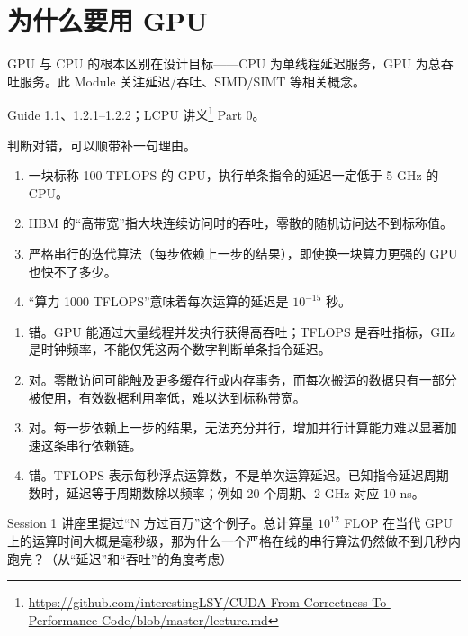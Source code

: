 \documentclass[11pt,a4paper,fontset=none]{ctexart}
\begin{document}
\section{为什么要用 GPU}

GPU 与 CPU 的根本区别在设计目标——CPU 为单线程延迟服务，GPU 为总吞吐服务。此 Module 关注延迟/吞吐、SIMD/SIMT 等相关概念。

\begin{reading}
Guide 1.1、1.2.1--1.2.2；LCPU 讲义\footnote{\url{https://github.com/interestingLSY/CUDA-From-Correctness-To-Performance-Code/blob/master/lecture.md}} Part 0。
\end{reading}

判断对错，可以顺带补一句理由。
\begin{enumerate}[label=(\alph*)]
  \item 一块标称 100 TFLOPS 的 GPU，执行单条指令的延迟一定低于 5 GHz 的 CPU。
  \item HBM 的“高带宽”指大块连续访问时的吞吐，零散的随机访问达不到标称值。
  \item 严格串行的迭代算法（每步依赖上一步的结果），即使换一块算力更强的 GPU 也快不了多少。
  \item “算力 1000 TFLOPS”意味着每次运算的延迟是 $10^{-15}$ 秒。
\end{enumerate}

\begin{tcolorbox}[title={1.1 作答（讨论后整理）},breakable]
\begin{enumerate}[label=(\alph*)]
  \item 错。GPU 能通过大量线程并发执行获得高吞吐；TFLOPS 是吞吐指标，GHz 是时钟频率，不能仅凭这两个数字判断单条指令延迟。
  \item 对。零散访问可能触及更多缓存行或内存事务，而每次搬运的数据只有一部分被使用，有效数据利用率低，难以达到标称带宽。
  \item 对。每一步依赖上一步的结果，无法充分并行，增加并行计算能力难以显著加速这条串行依赖链。
  \item 错。TFLOPS 表示每秒浮点运算数，不是单次运算延迟。已知指令延迟周期数时，延迟等于周期数除以频率；例如 20 个周期、2 GHz 对应 10 ns。
\end{enumerate}
\end{tcolorbox}

Session 1 讲座里提过“N 方过百万”这个例子。总计算量 $10^{12}$ FLOP 在当代 GPU 上的运算时间大概是毫秒级，那为什么一个严格在线的串行算法仍然做不到几秒内跑完？（从“延迟”和“吞吐”的角度考虑）
\end{document}
